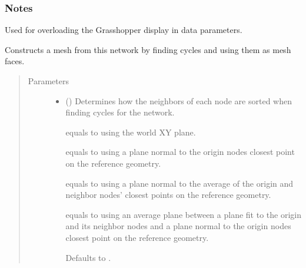 \documentclass[letterpaper,10pt,english]{sphinxmanual}
\begin{document}
\begin{fulllineitems}
\begin{fulllineitems}
\begin{quote}
\begin{description}
\end{description}\end{quote}
\subsubsection*{Notes}

Used for overloading the Grasshopper display in data parameters.

\end{fulllineitems}


\begin{fulllineitems}
\label{\detokenize{cockatoo:cockatoo.KnitDiNetwork.create_mesh}}
Constructs a mesh from this network by finding cycles and using them as
mesh faces.
\begin{quote}\begin{description}
\item[{Parameters}] \leavevmode\begin{itemize}
\item {} 
 (\sphinxstyleliteralemphasis{\sphinxupquote{, }}) \textendash{} 
Determines how the neighbors of each node are sorted when finding
cycles for the network.

 equals to using the world XY plane.

 equals to using a plane normal to the origin nodes closest
point on the reference geometry.

 equals to using a plane normal to the average of the origin
and neighbor nodes’ closest points on the reference geometry.

 equals to using an average plane between a plane fit to the
origin and its neighbor nodes and a plane normal to the origin
nodes closest point on the reference geometry.

Defaults to .



\end{itemize}
\end{description}
\end{quote}
\end{fulllineitems}
\end{fulllineitems}
\end{document}
